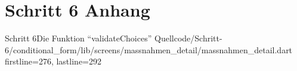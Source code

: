 \chapter{Schritt 6 Anhang} 
\label{appendix:Schritt6Anhang}

\begin{alexlisting}{Schritt 6}{Die Funktion \enquote{validateChoices}}
    {Quellcode/Schritt-6/conditional_form/lib/screens/massnahmen_detail/massnahmen_detail.dart}
    {firstline=276, lastline=292}
    \label{lst:Schritt6validateChoices}
  \end{alexlisting}
